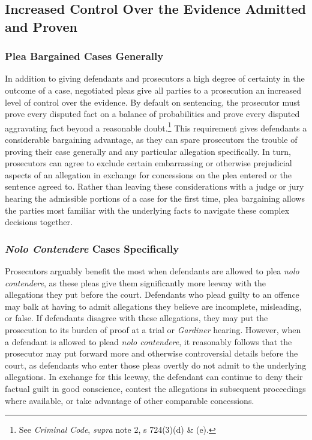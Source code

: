 \subsection{Increased Control Over the Evidence Admitted and Proven}

\subsubsection{Plea Bargained Cases Generally}

In addition to giving defendants and prosecutors a high degree of certainty in the outcome of a case, negotiated pleas give all parties to a prosecution an increased level of control over the evidence. By default on sentencing, the prosecutor must prove every disputed fact on a balance of probabilities and prove every disputed aggravating fact beyond a reasonable doubt.\footnote{See \textit{Criminal Code}, \textit{supra} note 2, s 724(3)(d) \& (e).} This requirement gives defendants a considerable bargaining advantage, as they can spare prosecutors the trouble of proving their case generally and any particular allegation specifically. In turn, prosecutors can agree to exclude certain embarrassing or otherwise prejudicial aspects of an allegation in exchange for concessions on the plea entered or the sentence agreed to. Rather than leaving these considerations with a judge or jury hearing the admissible portions of a case for the first time, plea bargaining allows the parties most familiar with the underlying facts to navigate these complex decisions together.

\subsubsection{\textit{Nolo Contendere} Cases Specifically}

Prosecutors arguably benefit the most when defendants are allowed to plea \textit{nolo contendere}, as these pleas give them significantly more leeway with the allegations they put before the court. Defendants who plead guilty to an offence may balk at having to admit allegations they believe are incomplete, misleading, or false. If defendants disagree with these allegations, they may put the prosecution to its burden of proof at a trial or \textit{Gardiner} hearing. However, when a defendant is allowed to plead \textit{nolo contendere}, it reasonably follows that the prosecutor may put forward more and otherwise controversial details before the court, as defendants who enter those pleas overtly do not admit to the underlying allegations. In exchange for this leeway, the defendant can continue to deny their factual guilt in good conscience, contest the allegations in subsequent proceedings where available, or take advantage of other comparable concessions.

